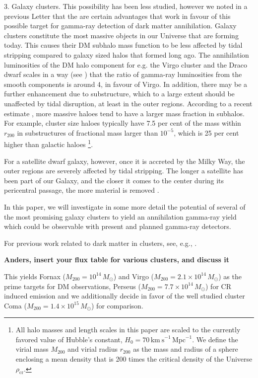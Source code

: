 \documentclass[10pt,aps,pra,reprint,amsmath,amsfonts,amssymb,showpacs]{revtex4-1}
\newcommand{\rmn}{\mathrm}
\newcommand{\msun}{M_\odot}
\newcommand{\rvir}{r_{200}}
\newcommand{\mvir}{M_{200}}
\begin{document}
3. Galaxy clusters. This possibility has been less studied, however we
noted in a previous Letter \cite{2009PhRvL.103r1302P} that the are
certain advantages that work in favour of this possible target for
gamma-ray detection of dark matter annihilation.  Galaxy clusters
constitute the most massive objects in our Universe that are forming
today. This causes their DM subhalo mass function to be less affected
by tidal stripping compared to galaxy sized halos that formed long
ago.  The annihilation luminosities of the DM halo component for
e.g. the Virgo cluster and the Draco dwarf scales in a way (see
\cite{2009PhRvL.103r1302P}) that the ratio of gamma-ray luminosities
from the smooth components is around 4, in favour of Virgo. In
addition, there may be a further enhancement due to substructure,
which to a large extent should be unaffected by tidal disruption, at
least in the outer regions.  According to a recent estimate
\cite{2011MNRAS.410.2309G}, more massive haloes tend to have a larger
mass fraction in subhalos.  For example, cluster size haloes typically
have 7.5 per cent of the mass within $r_{200}$ in substructures of
fractional mass larger than $10^{-5}$, which is 25 per cent higher
than galactic haloes \footnote{All halo masses and length scales in
  this paper are scaled to the currently favored value of Hubble's
  constant, $H_0 = 70\, \rmn{km~s}^{-1}\,\rmn{Mpc}^{-1}$. We define the
  virial mass $\mvir$ and virial radius $\rvir$ as the mass and radius
  of a sphere enclosing a mean density that is 200 times the critical
  density of the Universe $\rho_{\rmn{cr}}$.}.

For a satellite dwarf galaxy, however, once it is accreted by the
Milky Way, the outer regions are severely affected by tidal
stripping. The longer a satellite has been part of our Galaxy, and the
closer it comes to the center during its pericentral passage, the more
material is removed \cite{2004MNRAS.355..819G}.

In this paper, we will investigate in some more detail the potential
of several of the most promising galaxy clusters to yield an
annihilation gamma-ray yield which could be observable with present
and planned gamma-ray detectors.

For previous work related to dark matter in clusters, see, e.g.,
\cite{2006A&A...455...21C,2009PhRvD..80b3005J}. 


{\bf Anders, insert your flux table for various clusters, and discuss it}

This yields Fornax ($\mvir=10^{14}\,\msun$) and Virgo
($\mvir=2.1\times10^{14}\,\msun$) \cite{} as the prime targets for DM
observations, Perseus ($\mvir=7.7\times10^{14}\,\msun$) for CR induced
emission and we additionally decide in favor of the well studied
cluster Coma ($\mvir=1.4\times10^{15}\,\msun$) for comparison.
\end{document}
